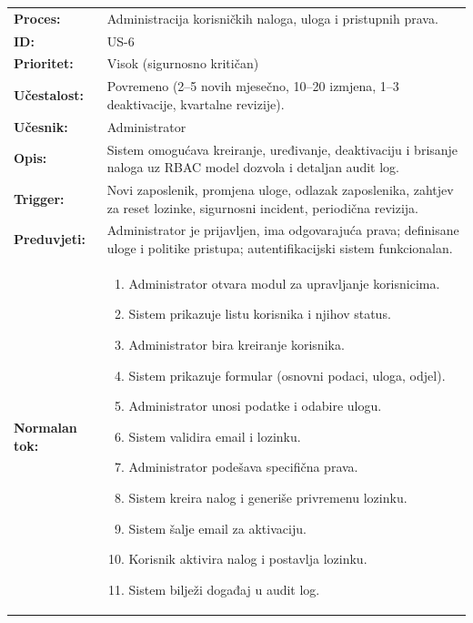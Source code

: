 \documentclass{article}
\begin{document}
\begin{table}[H]
\centering
\small
\begin{tabular}{|>{\raggedright}p{3.5cm}|>{\raggedright\arraybackslash}p{11cm}|}
\hline
\rowcolor[HTML]{B4C7E7}
\multicolumn{2}{|c|}{\textbf{US-6: Upravljanje korisnicima}} \\
\hline
\textbf{Proces:} & Administracija korisničkih naloga, uloga i pristupnih prava. \\
\hline
\textbf{ID:} & US-6 \\
\hline
\textbf{Prioritet:} & Visok (sigurnosno kritičan) \\
\hline
\textbf{Učestalost:} & Povremeno (2–5 novih mjesečno, 10–20 izmjena, 1–3 deaktivacije, kvartalne revizije). \\
\hline
\textbf{Učesnik:} & Administrator \\
\hline
\textbf{Opis:} & Sistem omogućava kreiranje, uređivanje, deaktivaciju i brisanje naloga uz RBAC model dozvola i detaljan audit log. \\
\hline
\textbf{Trigger:} & Novi zaposlenik, promjena uloge, odlazak zaposlenika, zahtjev za reset lozinke, sigurnosni incident, periodična revizija. \\
\hline
\textbf{Preduvjeti:} & Administrator je prijavljen, ima odgovarajuća prava; definisane uloge i politike pristupa; autentifikacijski sistem funkcionalan. \\
\hline
\textbf{Normalan tok:} & 
\begin{enumerate}[leftmargin=*, nosep]
    \item Administrator otvara modul za upravljanje korisnicima.
    \item Sistem prikazuje listu korisnika i njihov status.
    \item Administrator bira kreiranje korisnika.
    \item Sistem prikazuje formular (osnovni podaci, uloga, odjel).
    \item Administrator unosi podatke i odabire ulogu.
    \item Sistem validira email i lozinku.
    \item Administrator podešava specifična prava.
    \item Sistem kreira nalog i generiše privremenu lozinku.
    \item Sistem šalje email za aktivaciju.
    \item Korisnik aktivira nalog i postavlja lozinku.
    \item Sistem bilježi događaj u audit log.

\end{enumerate}
\end{tabular}
\end{table}
\end{document}

